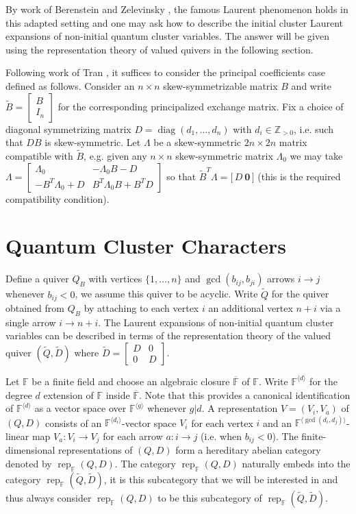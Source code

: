 \documentclass{amsart}
\newcommand{\FF}{\mathbb{F}}
\newcommand{\diag}{\operatorname{diag}}
\newcommand{\rep}{\operatorname{rep}}
\newcommand{\ZZ}{\mathbb{Z}}
\begin{document}
  By work of Berenstein and Zelevinsky \cite{berenstein-zelevinsky}, the famous Laurent phenomenon holds in this adapted setting and one may ask how to describe the initial cluster Laurent expansions of non-initial quantum cluster variables.  
  The answer will be given using the representation theory of valued quivers in the following section.

  Following work of Tran \cite{tran}, it suffices to consider the principal coefficients case defined as follows.  
  Consider an $n\times n$ skew-symmetrizable matrix $B$ and write $\tilde B=\left[\begin{array}{c}B\\ I_n\end{array}\right]$ for the corresponding principalized exchange matrix.  
  Fix a choice of diagonal symmetrizing matrix $D=\diag(d_1,\ldots,d_n)$ with $d_i\in\ZZ_{>0}$, i.e. such that $DB$ is skew-symmetric.
  Let $\Lambda$ be a skew-symmetric $2n\times2n$ matrix compatible with $\tilde B$, e.g. given any $n\times n$ skew-symmetric matrix $\Lambda_0$ we may take $\Lambda=\left[\begin{array}{cc}\Lambda_0 & -\Lambda_0B-D\\ -B^T\Lambda_0+D & B^T\Lambda_0B+B^TD\end{array}\right]$ so that $\tilde B^T\Lambda=\big[\,D\ \boldsymbol{0}\,\big]$ (this is the required compatibility condition).

  \section{Quantum Cluster Characters}
  Define a quiver $Q_B$ with vertices $\{1,\ldots,n\}$ and $\gcd(b_{ij},b_{ji})$ arrows $i\longrightarrow j$ whenever $b_{ij}<0$, we assume this quiver to be acyclic.
  Write $\tilde Q$ for the quiver obtained from $Q_B$ by attaching to each vertex $i$ an additional vertex $n+i$ via a single arrow $i\to n+i$.  
  The Laurent expansions of non-initial quantum cluster variables can be described in terms of the representation theory of the valued quiver $(\tilde Q,\tilde D)$ where $\tilde D=\left[\begin{array}{cc}D&0\\0&D\end{array}\right]$.

  Let $\FF$ be a finite field and choose an algebraic closure $\overline{\FF}$ of $\FF$.  
  Write $\FF^{\langle d\rangle}$ for the degree $d$ extension of $\FF$ inside $\overline{\FF}$.
  Note that this provides a canonical identification of $\FF^{\langle d\rangle}$ as a vector space over $\FF^{\langle g\rangle}$ whenever $g|d$.  
  A representation $V=(V_i,V_a)$ of $(Q,D)$ consists of an $\FF^{\langle d_i\rangle}$-vector space $V_i$ for each vertex $i$ and an $\FF^{\langle\gcd(d_i,d_j)\rangle}$-linear map $V_a:V_i\to V_j$ for each arrow $a:i\to j$ (i.e. when $b_{ij}<0$).  
  The finite-dimensional representations of $(Q,D)$ form a hereditary abelian category denoted by $\rep_\FF(Q,D)$.  
  The category $\rep_\FF(Q,D)$ naturally embeds into the category $\rep_\FF(\tilde Q,\tilde D)$, it is this subcategory that we will be interested in and thus always consider $\rep_\FF(Q,D)$ to be this subcategory of $\rep_\FF(\tilde Q,\tilde D)$.  
\end{document}
